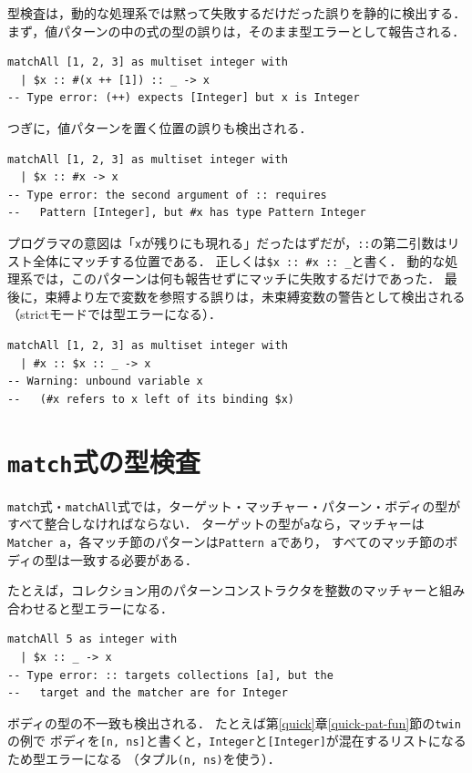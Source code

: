 型検査は，動的な処理系では黙って失敗するだけだった誤りを静的に検出する．
まず，値パターンの中の式の型の誤りは，そのまま型エラーとして報告される．
\begin{lstlisting}[language=egison,numbers=none]
matchAll [1, 2, 3] as multiset integer with
  | $x :: #(x ++ [1]) :: _ -> x
-- Type error: (++) expects [Integer] but x is Integer
\end{lstlisting}
つぎに，値パターンを置く位置の誤りも検出される．
\begin{lstlisting}[language=egison,numbers=none]
matchAll [1, 2, 3] as multiset integer with
  | $x :: #x -> x
-- Type error: the second argument of :: requires
--   Pattern [Integer], but #x has type Pattern Integer
\end{lstlisting}
プログラマの意図は「\lstinline{x}が残りにも現れる」だったはずだが，\lstinline{::}の第二引数はリスト全体にマッチする位置である．
正しくは\lstinline{$x :: #x :: _}と書く．
動的な処理系では，このパターンは何も報告せずにマッチに失敗するだけであった．
最後に，束縛より左で変数を参照する誤りは，未束縛変数の警告として検出される
（strictモードでは型エラーになる）．
\begin{lstlisting}[language=egison,numbers=none]
matchAll [1, 2, 3] as multiset integer with
  | #x :: $x :: _ -> x
-- Warning: unbound variable x
--   (#x refers to x left of its binding $x)
\end{lstlisting}

\section{\texttt{match}式の型検査}\label{matcher-match-typing}

\lstinline{match}式・\lstinline{matchAll}式では，ターゲット・マッチャー・パターン・ボディの型がすべて整合しなければならない．
ターゲットの型が\lstinline{a}なら，マッチャーは\lstinline{Matcher a}，各マッチ節のパターンは\lstinline{Pattern a}であり，
すべてのマッチ節のボディの型は一致する必要がある．

たとえば，コレクション用のパターンコンストラクタを整数のマッチャーと組み合わせると型エラーになる．
\begin{lstlisting}[language=egison,numbers=none]
matchAll 5 as integer with
  | $x :: _ -> x
-- Type error: :: targets collections [a], but the
--   target and the matcher are for Integer
\end{lstlisting}
ボディの型の不一致も検出される．
たとえば第\ref{quick}章\ref{quick-pat-fun}節の\lstinline{twin}の例で
ボディを\lstinline{[n, ns]}と書くと，\lstinline{Integer}と\lstinline{[Integer]}が混在するリストになるため型エラーになる
（タプル\lstinline{(n, ns)}を使う）．

